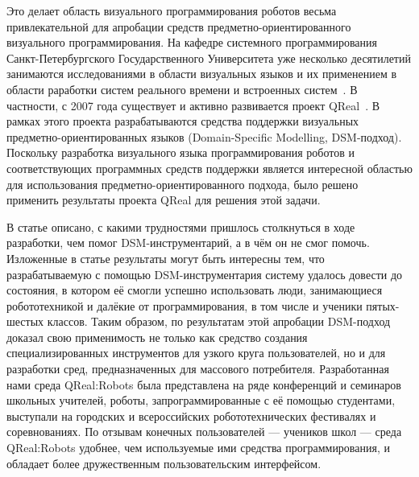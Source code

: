 \documentclass[a4paper]{article}
\begin{document}
Это делает область визуального программирования роботов весьма привлекательной для апробации средств предметно-ориентированного визуального программирования. На кафедре системного программирования Санкт-Петербургского Государственного Университета уже несколько десятилетий занимаются исследованиями в области визуальных языков и их применением в области раработки систем реального времени и встроенных систем~\cite{rtst1, rtst2, rtst3, videoDsl, dsmPlatforms, real1, real2, student1, student2, msfDsm}. В частности, с 2007 года существует и активно развивается проект QReal~\cite{qReal}. В рамках этого проекта разрабатываются средства поддержки визуальных предметно-ориентированных языков (Domain-Specific Modelling, DSM-подход). Поскольку разработка визуального языка программирования роботов и соответствующих программных средств поддержки является интересной областью для использования предметно-ориентированного подхода, было решено применить результаты проекта QReal для решения этой задачи. 

В статье описано, с какими трудностями пришлось столкнуться в ходе разработки, чем помог DSM-инструментарий, а в чём он не смог помочь. Изложенные в статье результаты могут быть интересны тем, что разрабатываемую с помощью DSM-инструментария систему удалось довести до состояния, в котором её смогли успешно использовать люди, занимающиеся робототехникой и далёкие от программирования, в том числе и ученики пятых-шестых классов. Таким образом, по результатам этой апробации DSM-подход доказал свою применимость не только как средство создания специализированных инструментов для узкого круга пользователей, но и для разработки сред, предназначенных для массового потребителя. Разработанная нами среда QReal:Robots была представлена на ряде конференций и семинаров школьных учителей, роботы, запрограммированные с её помощью студентами, выступали на городских и всероссийских робототехнических фестивалях и соревнованиях. По отзывам конечных пользователей --- учеников школ --- среда QReal:Robots удобнее, чем используемые ими средства программирования, и обладает более дружественным пользовательским интерфейсом.
\end{document}
